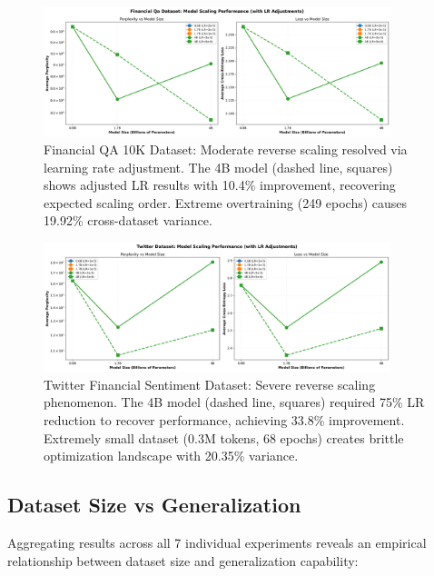 \begin{figure}[h]
\centering
\includegraphics[width=0.9\textwidth]{figures/scaling_financial_qa.png}
\caption[Financial QA 10K Dataset: Reverse Scaling]{Financial QA 10K Dataset: Moderate reverse scaling resolved via learning rate adjustment. The 4B model (dashed line, squares) shows adjusted LR results with 10.4\% improvement, recovering expected scaling order. Extreme overtraining (249 epochs) causes 19.92\% cross-dataset variance.}
\label{fig:scaling_financial_qa}
\end{figure}

\begin{figure}[h]
\centering
\includegraphics[width=0.9\textwidth]{figures/scaling_twitter.png}
\caption[Twitter Financial Sentiment Dataset: Reverse Scaling]{Twitter Financial Sentiment Dataset: Severe reverse scaling phenomenon. The 4B model (dashed line, squares) required 75\% LR reduction to recover performance, achieving 33.8\% improvement. Extremely small dataset (0.3M tokens, 68 epochs) creates brittle optimization landscape with 20.35\% variance.}
\label{fig:scaling_twitter}
\end{figure}





\subsection{Dataset Size vs Generalization}

Aggregating results across all 7 individual experiments reveals an empirical relationship between dataset size and generalization capability:

